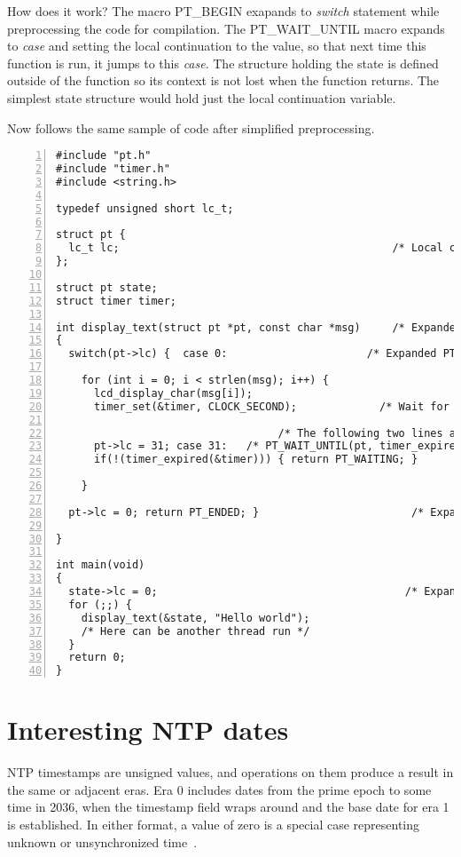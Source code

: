 How does it work? The macro PT\_BEGIN exapands to {\it switch} statement while preprocessing the
code for compilation.
The PT\_WAIT\_UNTIL macro expands to {\it case} and setting the local continuation
to the value, so that next time this function is run, it jumps to this {\it case}.
The structure holding the state is defined outside of the function so its context is not lost when
the function returns. The simplest state structure would hold just the local continuation variable.

Now follows
the same sample of code after simplified preprocessing.
\begin{lstlisting}[numbers=left]
#include "pt.h"
#include "timer.h"
#include <string.h>

typedef unsigned short lc_t;

struct pt {
  lc_t lc;                                           /* Local continuation */
}; 

struct pt state;
struct timer timer;

int display_text(struct pt *pt, const char *msg)     /* Expanded PT_THREAD */
{
  switch(pt->lc) {  case 0:                      /* Expanded PT_BEGIN(pt); */
  
    for (int i = 0; i < strlen(msg); i++) {
      lcd_display_char(msg[i]);
      timer_set(&timer, CLOCK_SECOND);             /* Wait for one second. */
    
                                   /* The following two lines are expanded */
      pt->lc = 31; case 31:   /* PT_WAIT_UNTIL(pt, timer_expired(&timer)); */
      if(!(timer_expired(&timer))) { return PT_WAITING; }         /* macro */
    
    }
  
  pt->lc = 0; return PT_ENDED; }                        /* Expanded PT_END */
  
}

int main(void)
{
  state->lc = 0;                                       /* Expanded PT_INIT */
  for (;;) {
    display_text(&state, "Hello world");
    /* Here can be another thread run */
  }
  return 0;
}

\end{lstlisting}

\chapter{Interesting NTP dates}\label{app:dates}
NTP timestamps are unsigned values, and operations on them produce a
result in the same or adjacent eras.
Era 0 includes dates from the prime epoch to some time in 2036,
when the timestamp field wraps around and the base date for era 1 is established.
In either format, a value of zero is a special case representing unknown or
unsynchronized time~\cite{rfc5905}.


